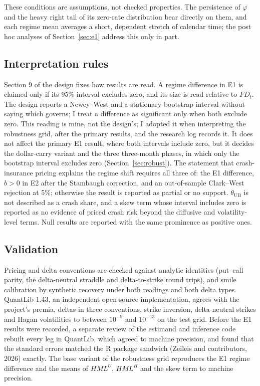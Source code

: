 \documentclass[11pt]{article}
\theoremstyle{result}
\newcommand{\HML}{\mathit{HML}}
\newcommand{\FD}{\mathit{FD}}
\newcommand{\thUB}{\theta_{\mathrm{UB}}}
\begin{document}
These conditions are assumptions, not checked properties. The persistence of $\varphi$ and the heavy right tail of its zero-rate distribution bear directly on them, and each regime mean averages a short, dependent stretch of calendar time; the post hoc analyses of Section~\ref{sec:e1} address this only in part.

\subsection{Interpretation rules}

Section 9 of the design fixes how results are read. A regime difference in E1 is claimed only if its 95\% interval excludes zero, and its size is read relative to $\FD_t$. The design reports a Newey--West and a stationary-bootstrap interval without saying which governs; I treat a difference as significant only when both exclude zero. This reading is mine, not the design's; I adopted it when interpreting the robustness grid, after the primary results, and the research log records it. It does not affect the primary E1 result, where both intervals include zero, but it decides the dollar-carry variant and the three three-month phases, in which only the bootstrap interval excludes zero (Section~\ref{sec:robust}). The statement that crash-insurance pricing explains the regime shift requires all three of: the E1 difference, $b>0$ in E2 after the Stambaugh correction, and an out-of-sample Clark--West rejection at 5\%; otherwise the result is reported as partial or no support. $\thUB$ is not described as a crash share, and a skew term whose interval includes zero is reported as no evidence of priced crash risk beyond the diffusive and volatility-level terms. Null results are reported with the same prominence as positive ones.

\subsection{Validation}

Pricing and delta conventions are checked against analytic identities (put--call parity, the delta-neutral straddle and delta-to-strike round trips), and smile calibration by synthetic recovery under both readings and both delta types. QuantLib 1.43, an independent open-source implementation, agrees with the project's premia, deltas in three conventions, strike inversion, delta-neutral strikes and Hagan volatilities to between $10^{-9}$ and $10^{-13}$ on the test grid. Before the E1 results were recorded, a separate review of the estimand and inference code rebuilt every leg in QuantLib, which agreed to machine precision, and found that the standard errors matched the R package sandwich (Zeileis and contributors, 2026) exactly. The base variant of the robustness grid reproduces the E1 regime difference and the means of $\HML^U$, $\HML^H$ and the skew term to machine precision.
\end{document}
